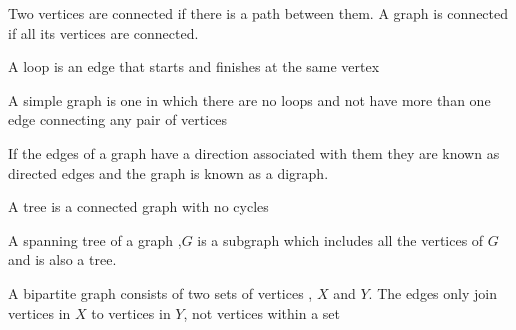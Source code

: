 \documentclass[a4paper]{article}
\begin{document}
\begin{defi}[Connected]
Two vertices are connected if there is a path between them. A graph is connected if all its vertices are connected.
\end{defi}

\begin{defi}[Loop]
A loop is an edge that starts and finishes at the same vertex
\end{defi}

\begin{defi}
A simple graph is one in which there are no loops and not have more than one edge connecting any pair of vertices
\end{defi}

\begin{defi}[Digraph]
If the edges of a graph have a direction associated with them they are known as directed edges and the graph is known as a digraph.
\end{defi}

\begin{defi}[Tree]
A tree is a connected graph with no cycles
\end{defi}

\begin{defi}
A spanning tree of a graph ,$G$ is a subgraph which includes all the vertices of $G$ and is also a tree.
\end{defi}

\begin{defi}
A bipartite graph consists of two sets of vertices , $X$ and $Y$. The edges only join vertices in $X$ to vertices in $Y$, not vertices within a set
\end{defi}

\end{document}
